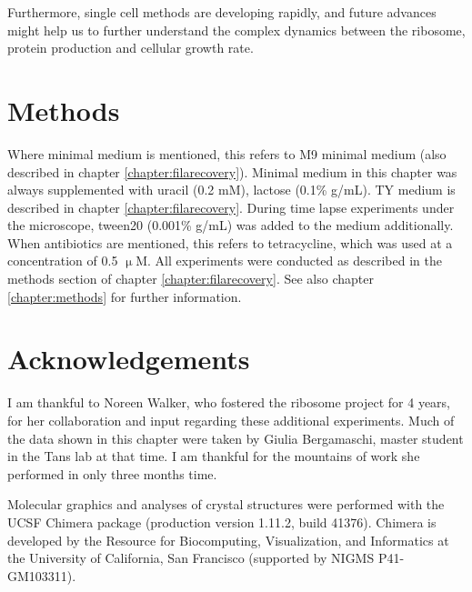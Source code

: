 
Furthermore, single cell methods are developing rapidly, and future advances might help us to further understand the complex dynamics between the ribosome, protein production and cellular growth rate.




\section{Methods}

Where minimal medium is mentioned, this refers to M9 minimal medium (also described in chapter \ref{chapter:filarecovery}).
%
Minimal medium in this chapter was always supplemented with uracil (0.2 mM), lactose (0.1\% g/mL).
TY medium is described in chapter \ref{chapter:filarecovery}.
%
During time lapse experiments under the microscope, tween20 (0.001\% g/mL) was added to the medium additionally.
%
When antibiotics are mentioned, this refers to tetracycline, which was used at a concentration of 0.5 $\upmu$M.
%
All experiments were conducted as described in the methods section of chapter \ref{chapter:filarecovery}.
See also chapter \ref{chapter:methods} for further information.

\section{Acknowledgements}

%
I am thankful to Noreen Walker, who fostered the ribosome project for 4 years, for her collaboration and input regarding these additional experiments.
%
Much of the data shown in this chapter were taken by Giulia Bergamaschi, master student in the Tans lab at that time. I am thankful for 
the mountains of work she performed in only three months time.

Molecular graphics and analyses 
of crystal structures
%
were performed with the UCSF Chimera package (production version 1.11.2, build 41376). Chimera is developed by the Resource for Biocomputing, Visualization, and Informatics at the University of California, San Francisco (supported by NIGMS P41-GM103311). 




